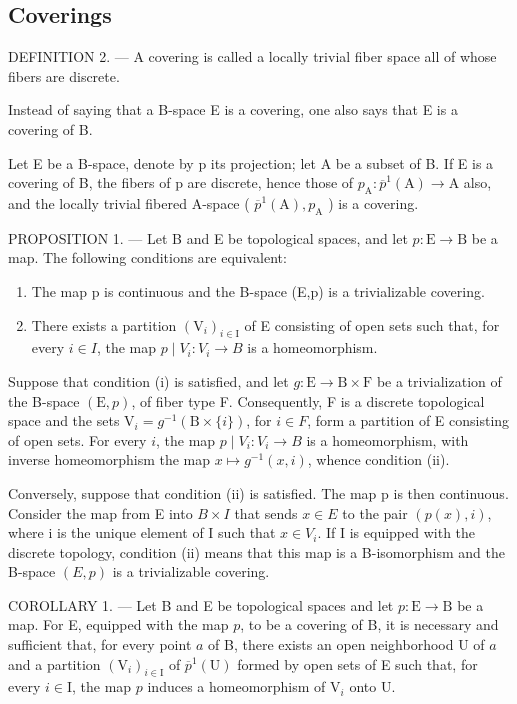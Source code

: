 \subsection{Coverings}

DEFINITION 2. --- A covering is called a locally trivial fiber space all of whose fibers are discrete.

Instead of saying that a B-space E is a covering, one also says that E is a covering of B.

Let E be a B-space, denote by p its projection; let A be a subset of B. If E is a covering of B, the fibers of p are discrete, hence those of \(p_{\mathrm{A}} \colon \overline{p}^{1}(\mathrm{A}) \to \mathrm{A}\) also, and the locally trivial fibered A-space ( \(\overline{p}^{1}(\mathrm{A}), p_{\mathrm{A}}\) ) is a covering.

PROPOSITION 1. --- Let B and E be topological spaces, and let \(p\colon \mathrm{E}\to \mathrm{B}\) be a map. The following conditions are equivalent:

\begin{enumerate}
\def\labelenumi{(\roman{enumi})}
\item
  The map p is continuous and the B-space (E,p) is a trivializable covering.
\item
  There exists a partition \((\mathrm{V}_{i})_{i\in\mathrm{I}}\) of E consisting of open sets such that, for every \(i\in I\), the map \(p\mid V_{i}\colon V_{i}\to B\) is a homeomorphism.
\end{enumerate}

Suppose that condition (i) is satisfied, and let \(g \colon \mathrm{E} \to \mathrm{B} \times \mathrm{F}\) be a trivialization of the B-space \((\mathrm{E}, p)\), of fiber type F. Consequently, F is a discrete topological space and the sets \(\mathrm{V}_i = g^{-1}(\mathrm{B} \times \{i\})\), for \(i \in F\), form a partition of E consisting of open sets. For every \(i\), the map \(p \mid V_i \colon V_i \to B\) is a homeomorphism, with inverse homeomorphism the map \(x \mapsto g^{-1}(x, i)\), whence condition (ii).

Conversely, suppose that condition (ii) is satisfied. The map p is then continuous. Consider the map from E into \(B \times I\) that sends \(x \in E\) to the pair \((p(x), i)\), where i is the unique element of I such that \(x \in V_i\). If I is equipped with the discrete topology, condition (ii) means that this map is a B-isomorphism and the B-space \((E, p)\) is a trivializable covering.

COROLLARY 1. --- Let B and E be topological spaces and let \(p\colon \mathrm{E}\to \mathrm{B}\) be a map. For E, equipped with the map \(p\), to be a covering of B, it is necessary and sufficient that, for every point \(a\) of B, there exists an open neighborhood U of \(a\) and a partition \((\mathrm{V}_i)_{i\in \mathrm{I}}\) of \(\overline{p}^{1}(\mathrm{U})\) formed by open sets of E such that, for every \(i\in \mathrm{I}\), the map \(p\) induces a homeomorphism of \(\mathrm{V}_i\) onto U.

